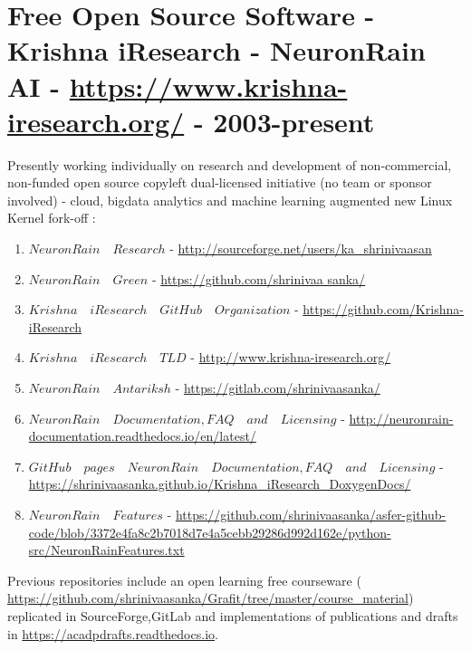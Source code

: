 \documentclass[11pt,onecolumn]{article}
\begin{document}
\section{Free Open Source Software - Krishna iResearch - NeuronRain AI - \url {https://www.krishna-iresearch.org/} - 2003-present}
Presently working individually on research and development of non-commercial, non-funded open source copyleft dual-licensed initiative (no team or sponsor involved) - cloud, bigdata analytics and machine learning augmented new Linux Kernel fork-off $:$ \\
\begin{enumerate}
\item[$\bullet$] $NeuronRain \quad Research$ - \url {http://sourceforge.net/users/ka_shrinivaasan} \\
\item[$\bullet$] $NeuronRain \quad Green$ - \url {https://github.com/shrinivaa sanka/} \\
\item[$\bullet$] $Krishna \quad iResearch \quad GitHub \quad Organization$ - \url {https://github.com/Krishna-iResearch} \\
\item[$\bullet$] $Krishna \quad iResearch \quad TLD $ - \url {http://www.krishna-iresearch.org/} \\
\item[$\bullet$] $NeuronRain \quad Antariksh$ - \url {https://gitlab.com/shrinivaasanka/} \\
\item[$\bullet$] $NeuronRain \quad Documentation, FAQ \quad and \quad Licensing$ - \url {http://neuronrain-documentation.readthedocs.io/en/latest/} \\
\item[$\bullet$] $GitHub \quad pages \quad NeuronRain \quad Documentation, FAQ \quad and \quad Licensing$ - \url {https://shrinivaasanka.github.io/Krishna_iResearch_DoxygenDocs/} \\
\item[$\bullet$] $NeuronRain \quad Features $ - \url {https://github.com/shrinivaasanka/asfer-github-code/blob/3372e4fa8c2b7018d7e4a5cebb29286d992d162e/python-src/NeuronRainFeatures.txt} \\
\end{enumerate}
Previous repositories include an open learning free courseware ( \url {https://github.com/shrinivaasanka/Grafit/tree/master/course_material})  replicated in SourceForge,GitLab and implementations of publications and drafts in \url {https://acadpdrafts.readthedocs.io}.
\end{document}
